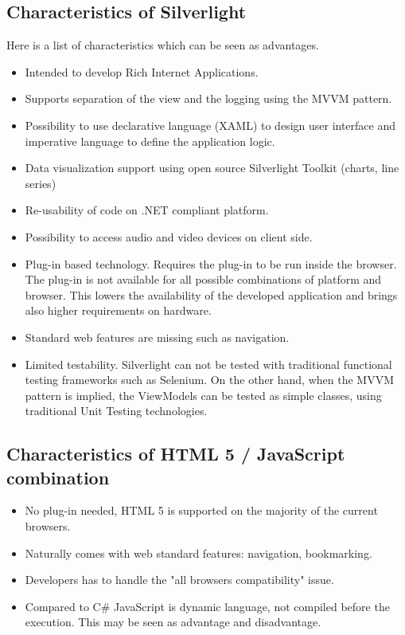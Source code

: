 \subsection{Characteristics of Silverlight}
Here is a list of characteristics which can be seen as advantages.
\begin{itemize}
	\item Intended to develop Rich Internet Applications.
	\item Supports separation of the view and the logging using the MVVM pattern.
	\item Possibility to use declarative language (XAML) to design user interface and imperative language to define the application logic.
	\item Data visualization support using open source Silverlight Toolkit (charts, line series)
	\item Re-usability of code on .NET compliant platform.
	\item Possibility to access audio and video devices on client side.
	\item Plug-in based technology. Requires the plug-in to be run inside the browser. The plug-in is not available for all possible combinations of platform and browser. This lowers the availability of the developed application and brings also higher requirements on hardware.
	\item Standard web features are missing such as navigation.
	\item Limited testability. Silverlight can not be tested with traditional functional testing frameworks such as Selenium. On the other hand, when the MVVM pattern is implied, the ViewModels can be tested as simple classes, using traditional Unit Testing technologies.
\end{itemize}

\subsection{Characteristics of HTML 5 / JavaScript combination}
\begin{itemize}
	\item  No plug-in needed, HTML 5 is supported on the majority of the current browsers.
	\item  Naturally comes with web standard features: navigation, bookmarking.
	\item  Developers has to handle the "all browsers compatibility" issue.
	\item  Compared to C\# JavaScript is dynamic language, not compiled before the execution. This may be seen as advantage and disadvantage.
\end{itemize}

